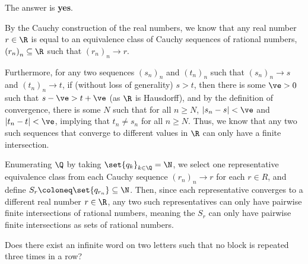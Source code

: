 \documentclass[10pt]{mypackage}
\begin{document}
\begin{solution}
  The answer is \textbf{yes}.\newline

  By the Cauchy construction of the real numbers, we know that any real number $r\in \R$ is equal to an equivalence class of Cauchy sequences of rational numbers, $\left( r_n \right)_n\subseteq \R$ such that $\left( r_n \right)_n\rightarrow r$.\newline

  Furthermore, for any two sequences $\left( s_n \right)_n$ and $\left( t_n \right)_n$ such that $\left( s_n \right)_n\rightarrow s$ and $\left( t_n \right)_n\rightarrow t$,  if (without loss of generality) $s > t$, then there is some $\ve > 0$ such that $s - \ve > t + \ve$ (as $\R$ is Hausdorff), and by the definition of convergence, there is some $N$ such that for all $n\geq N$, $\left\vert s_n - s \right\vert < \ve$ and $\left\vert t_n - t \right\vert < \ve$, implying that $t_n\neq s_n$ for all $n\geq N$. Thus, we know that any two such sequences that converge to different values in $\R$ can only have a finite intersection.\newline

  Enumerating $\Q $ by taking $ \set{q_k}_{k\in \Q} = \N$, we select one representative equivalence class from each Cauchy sequence $\left( r_n \right)_n\rightarrow r$ for each $r\in R$, and define $S_r \coloneq \set{q_{r_n}}\subseteq \N$. Then, since each representative converges to a different real number $r\in \R$, any two such representatives can only have pairwise finite intersections of rational numbers, meaning the $S_r$ can only have pairwise finite intersections as sets of rational numbers.
\end{solution}
\begin{problem}
  Does there exist an infinite word on two letters such that no block is repeated three times in a row?
\end{problem}
\end{document}
